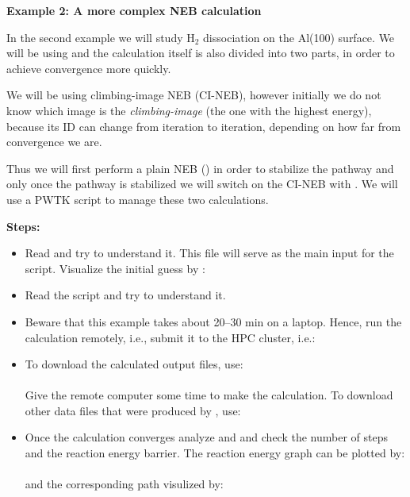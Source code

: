 \documentclass[landscape]{foils}
\begin{document}
{\bf Example 2: A more complex NEB calculation}

In the second example we will study $\mathrm{H_2} $ dissociation on
the Al(100) surface. We will be using  and
the calculation itself is also divided into two parts, in order to
achieve convergence more quickly.

We will be using climbing-image NEB (CI-NEB), however initially we do
not know which image is the {\em climbing-image} (the one with the
highest energy), because its ID can change from iteration to
iteration, depending on how far from convergence we are.

Thus we will first perform a plain NEB () in
order to stabilize the pathway and only once the pathway is stabilized we will
switch on the CI-NEB with . We will use a
PWTK script to manage these two calculations.

{\bf{Steps:}}
\begin{itemize}
\item{Read  and try to understand
    it.
    This file will serve as the main input for the  script. Visualize the initial guess by :\\
    }
\item{Read the  script and try to understand it. }
\item{Beware that this example takes about 20--30 min on a
    laptop. Hence, run the calculation remotely, i.e., submit it to
    the HPC cluster, i.e.:\\
    }
\item To download the calculated output files, use:\\
  \\[0.5em]  
  Give the remote computer some time to make the calculation. To
  download other data files that were produced by , use:\\[0.5em]
\item{Once the calculation converges analyze  and
     and check the number of steps and the reaction
    energy barrier.
    The reaction energy graph can be plotted by:\\
     \\[0.5em]
    and the corresponding path visulized by: \\
     }
\end{itemize}
\end{document}
